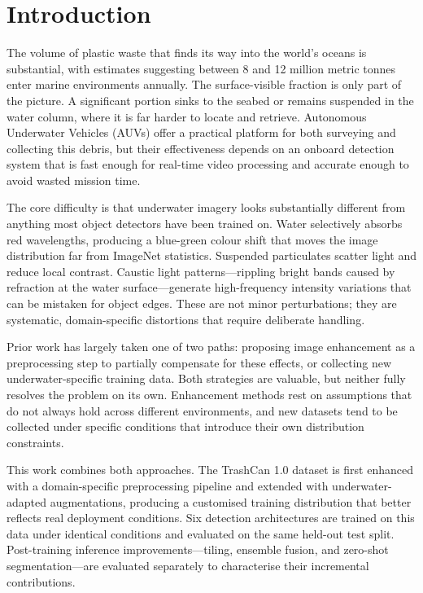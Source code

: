 \documentclass[conference]{IEEEtran}
\begin{document}

\section{Introduction}

The volume of plastic waste that finds its way into the world's oceans is
substantial, with estimates suggesting between 8 and 12 million metric tonnes
enter marine environments annually. The surface-visible fraction is only part
of the picture. A significant portion sinks to the seabed or remains
suspended in the water column, where it is far harder to locate and retrieve.
Autonomous Underwater Vehicles (AUVs) offer a practical platform for both
surveying and collecting this debris, but their effectiveness depends on an
onboard detection system that is fast enough for real-time video processing
and accurate enough to avoid wasted mission time.

The core difficulty is that underwater imagery looks substantially different
from anything most object detectors have been trained on. Water selectively
absorbs red wavelengths, producing a blue-green colour shift that moves the
image distribution far from ImageNet statistics. Suspended particulates
scatter light and reduce local contrast. Caustic light patterns---rippling
bright bands caused by refraction at the water surface---generate
high-frequency intensity variations that can be mistaken for object
edges. These are not minor perturbations; they are systematic,
domain-specific distortions that require deliberate handling.

Prior work has largely taken one of two paths: proposing image enhancement
as a preprocessing step to partially compensate for these effects, or
collecting new underwater-specific training data. Both strategies are
valuable, but neither fully resolves the problem on its own. Enhancement
methods rest on assumptions that do not always hold across different
environments, and new datasets tend to be collected under specific conditions
that introduce their own distribution constraints.

This work combines both approaches. The TrashCan 1.0 dataset \cite{b3} is
first enhanced with a domain-specific preprocessing pipeline and extended
with underwater-adapted augmentations, producing a customised training
distribution that better reflects real deployment conditions. Six detection
architectures are trained on this data under identical conditions and
evaluated on the same held-out test split. Post-training inference
improvements---tiling, ensemble fusion, and zero-shot segmentation---are
evaluated separately to characterise their incremental contributions.
\end{document}
